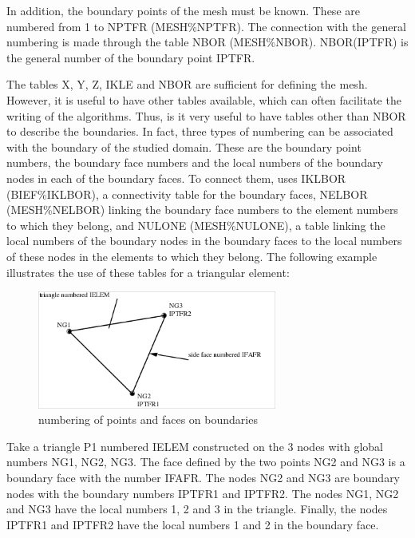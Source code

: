In addition, the boundary points of the mesh must be known. These are numbered
from 1 to NPTFR (MESH\%NPTFR). The connection with the general numbering is
made through the table NBOR (MESH\%NBOR). NBOR(IPTFR) is the general number of
the boundary point IPTFR.

The tables X, Y, Z, IKLE and NBOR are sufficient for defining the mesh.
However, it is useful to have other tables available, which can often
facilitate the writing of the algorithms. Thus, is it very useful to have
tables other than NBOR to describe the boundaries. In fact, three types of
numbering can be associated with the boundary of the studied domain. These are
the boundary point numbers, the boundary face numbers and the local numbers of
the boundary nodes in each of the boundary faces. To connect them, \bief uses
IKLBOR (BIEF\%IKLBOR), a connectivity table for the boundary faces, NELBOR
(MESH\%NELBOR) linking the boundary face numbers to the element numbers to
which they belong, and NULONE (MESH\%NULONE), a table linking the local numbers
of the boundary nodes in the boundary faces to the local numbers of these nodes
in the elements to which they belong. The following example illustrates the use
of these tables for a triangular element:

\begin{figure}[H]%
\begin{center}
%
  \includegraphics[width=0.7\textwidth]{./graphics/triangle}
%
\end{center}
\caption{numbering of points and faces on boundaries}
\label{fig:triangle}
\end{figure}

Take a triangle P1 numbered IELEM constructed on the 3 nodes with global
numbers NG1, NG2, NG3. The face defined by the two points NG2 and NG3 is a
boundary face with the number IFAFR. The nodes NG2 and NG3 are boundary nodes
with the boundary numbers IPTFR1 and IPTFR2. The nodes NG1, NG2 and NG3 have
the local numbers 1, 2 and 3 in the triangle. Finally, the nodes IPTFR1 and
IPTFR2 have the local numbers 1 and 2 in the boundary face.


